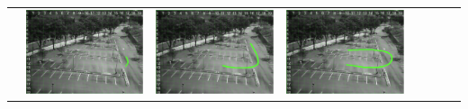 \begin{table}[]
\begin{tabular}{llllllll}
 & \includegraphics{image/suppResults/q3.PNG}
 & \includegraphics{image/suppResults/q4.PNG}
 & \includegraphics{image/suppResults/q5.PNG}

\end{tabular}
\end{table}
